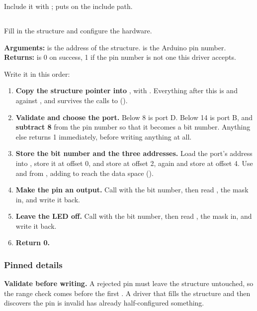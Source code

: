 Include it with ;  puts  on the
include path.

\subsection{}
\label{c2:sec:init}
Fill in the structure and configure the hardware.

\noindent\textbf{Arguments:}  is the address of the structure.  is the
Arduino pin number.\\
\textbf{Returns:}  is 0 on success, 1 if the pin number is not one this driver accepts.

\medskip
\noindent Write it in this order:
\begin{enumerate}
  \item \textbf{Copy the structure pointer into }, with . Everything after this
    is  and  against , and  survives the calls to
     ().
  \item \textbf{Validate and choose the port.} Below 8 is port D. Below 14 is port B, and
    \textbf{subtract 8} from the pin number so that it becomes a bit number. Anything else returns
    1 immediately, before writing anything at all.
  \item \textbf{Store the bit number and the three addresses.} Load the port's  address
    into , store it at offset 0,  and store at offset 2, 
    again and store at offset 4. Use  and  from , adding
     to reach the data space ().
  \item \textbf{Make the pin an output.} Call  with the bit number, then read
    ,  the mask in, and write it back.
  \item \textbf{Leave the LED off.} Call  with the bit number, then read
    ,  the mask in, and write it back.
  \item \textbf{Return 0.}
\end{enumerate}

\subsubsection{Pinned details}
\textbf{Validate before writing.} A rejected pin must leave the structure untouched, so the range
check comes before the first . A driver that fills the structure and then discovers the
pin is invalid has already half-configured something.

